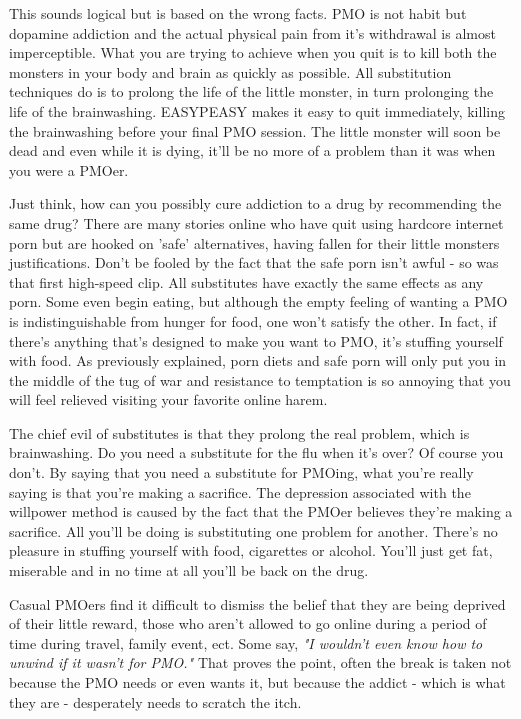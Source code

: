 \documentclass[easypeasy.tex]{subfiles}
\begin{document}
This sounds logical but is based on the wrong facts. PMO is not habit but dopamine addiction and the actual physical pain from it's withdrawal is almost imperceptible. What you are trying to achieve when you quit is to kill both the monsters in your body and brain as quickly as possible. All substitution techniques do is to prolong the life of the little monster, in turn prolonging the life of the brainwashing. EASYPEASY makes it easy to quit immediately, killing the brainwashing before your final PMO session. The little monster will soon be dead and even while it is dying, it'll be no more of a problem than it was when you were a PMOer.

Just think, how can you possibly cure addiction to a drug by recommending the same drug? There are many stories online who have quit using hardcore internet porn but are hooked on 'safe' alternatives, having fallen for their little monsters justifications. Don't be fooled by the fact that the safe porn isn't awful - so was that first high-speed clip. All substitutes have exactly the same effects as any porn. Some even begin eating, but although the empty feeling of wanting a PMO is indistinguishable from hunger for food, one won't satisfy the other. In fact, if there's anything that's designed to make you want to PMO, it's stuffing yourself with food. As previously explained, porn diets and safe porn will only put you in the middle of the tug of war and resistance to temptation is so annoying that you will feel relieved visiting your favorite online harem.

The chief evil of substitutes is that they prolong the real problem, which is brainwashing. Do you need a substitute for the flu when it's over? Of course you don't. By saying that you need a substitute for PMOing, what you're really saying is that you're making a sacrifice. The depression associated with the willpower method is caused by the fact that the PMOer believes they're making a sacrifice. All you'll be doing is substituting one problem for another. There's no pleasure in stuffing yourself with food, cigarettes or alcohol. You'll just get fat, miserable and in no time at all you'll be back on the drug.

Casual PMOers find it difficult to dismiss the belief that they are being deprived of their little reward, those who aren't allowed to go online during a period of time during travel, family event, ect. Some say, \textit{"I wouldn't even know how to unwind if it wasn't for PMO."} That proves the point, often the break is taken not because the PMO needs or even wants it, but because the addict - which is what they are - desperately needs to scratch the itch.
\end{document}
